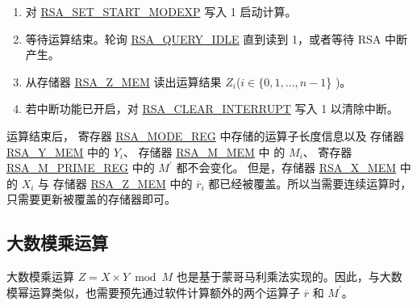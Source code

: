 \documentclass[main\_\_CN.tex]{subfiles}
\begin{document}
\begin{enumerate}
        只需要根据运算子长度，将各个运算子中有效的数据写入存储器，没有使用到的存储器可以是任意值。

    \item 对 \hyperref[fielddesc:RSASETSTARTMODEXP]{RSA\_SET\_START\_MODEXP} 写入 1 启动计算。

    \item 等待运算结束。轮询 \hyperref[fielddesc:RSAQUERYIDLE]{RSA\_QUERY\_IDLE} 直到读到 1，或者等待 RSA 中断产生。

    \item 从存储器 \hyperref[tab:rsa-mem]{RSA\_Z\_MEM} 读出运算结果 \begin{math}Z_{i}\end{math}(\begin{math}i \in \{ 0, 1, \dots, n-1 \end{math}\} )。

    \item 若中断功能已开启，对 \hyperref[fielddesc:RSACLEARINTERRUPT]{RSA\_CLEAR\_INTERRUPT} 写入 1 以清除中断。

\end{enumerate}

运算结束后，
寄存器 \hyperref[regdesc:RSAMODEREG]{RSA\_MODE\_REG} 中存储的运算子长度信息以及
存储器 \hyperref[tab:rsa-mem]{RSA\_Y\_MEM} 中的 \begin{math}Y_{i}\end{math}、
存储器 \hyperref[tab:rsa-mem]{RSA\_M\_MEM} 中 的 \begin{math}M_{i}\end{math}、
寄存器 \hyperref[regdesc:RSAMPRIMEREG]{RSA\_M\_PRIME\_REG} 中的 \begin{math}M^{\prime}\end{math} 都不会变化。
但是，存储器 \hyperref[tab:rsa-mem]{RSA\_X\_MEM} 中的 \begin{math}X_{i}\end{math} 与
存储器 \hyperref[tab:rsa-mem]{RSA\_Z\_MEM} 中的 \begin{math}\overline{r}_{i}\end{math}
都已经被覆盖。所以当需要连续运算时，只需要更新被覆盖的存储器即可。


\subsection{大数模乘运算}

大数模乘运算 \begin{math}Z = X \times Y \bmod M\end{math} 也是基于蒙哥马利乘法实现的。因此，与大数模幂运算类似，也需要预先通过软件计算额外的两个运算子
\begin{math}\overline{r}\end{math} 和
\begin{math}M^{\prime}\end{math}。
\end{document}
